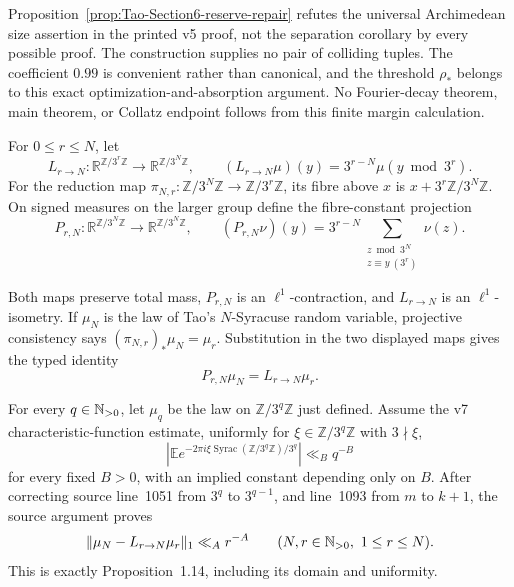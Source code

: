 \begin{nonclaim}
Proposition~\ref{prop:Tao-Section6-reserve-repair} refutes the universal
Archimedean size assertion in the printed v5 proof, not the separation
corollary by every possible proof.  The construction supplies no pair of
colliding tuples.  The coefficient \(0.99\) is convenient rather than
canonical, and the threshold \(\rho_*\) belongs to this exact
optimization-and-absorption argument.  No Fourier-decay theorem, main
theorem, or Collatz endpoint follows from this finite margin calculation.
\end{nonclaim}

\begin{definition}
\label{def:Tao-uniform-lift}
For \(0\le r\le N\), let
\[
 L_{r\to N}:\mathbb R^{\mathbb Z/3^r\mathbb Z}
 \longrightarrow\mathbb R^{\mathbb Z/3^N\mathbb Z},
 \qquad
 (L_{r\to N}\mu)(y)=3^{r-N}\mu(y\bmod3^r).
\]
For the reduction map
\(\pi_{N,r}:\mathbb Z/3^N\mathbb Z\to\mathbb Z/3^r\mathbb Z\), its fibre
above \(x\) is \(x+3^r\mathbb Z/3^N\mathbb Z\).  On signed measures on the
larger group define the fibre-constant projection
\[
 P_{r,N}:\mathbb R^{\mathbb Z/3^N\mathbb Z}
 \longrightarrow\mathbb R^{\mathbb Z/3^N\mathbb Z},\qquad
 (P_{r,N}\nu)(y)=3^{r-N}
 \sum_{\substack{z\bmod3^N\\z\equiv y\ (3^r)}}\nu(z).
\]
\end{definition}

Both maps preserve total mass, \(P_{r,N}\) is an \(\ell^1\)-contraction,
and \(L_{r\to N}\) is an \(\ell^1\)-isometry.  If \(\mu_N\) is the law of
Tao's \(N\)-Syracuse random variable, projective consistency says
\((\pi_{N,r})_*\mu_N=\mu_r\).  Substitution in the two displayed maps gives
the typed identity
\begin{equation}
\label{eq:Tao-lift-projective}
 P_{r,N}\mu_N=L_{r\to N}\mu_r.
\end{equation}

\begin{proposition}
\label{prop:Tao-v7-Fourier-to-mixing}
For every \(q\in\mathbb{N}_{>0}\), let \(\mu_q\) be the law on
\(\mathbb Z/3^q\mathbb Z\) just defined.  Assume the v7
characteristic-function estimate, uniformly for
\(\xi\in\mathbb Z/3^q\mathbb Z\) with \(3\nmid\xi\),
\begin{equation}
\label{eq:Tao-v7-characteristic-input}
 \left|\mathbb E
 e^{-2\pi i\xi\operatorname{Syrac}(\mathbb Z/3^q\mathbb Z)/3^q}
 \right|\ll_Bq^{-B}
\end{equation}
for every fixed \(B>0\), with an implied constant depending only on \(B\).
After correcting source line~1051 from \(3^q\)
to \(3^{q-1}\), and line~1093 from \(m\) to \(k+1\), the source argument
proves
\[
 \|\mu_N-L_{r\to N}\mu_r\|_1\ll_A r^{-A}
 \qquad(N,r\in\mathbb{N}_{>0},\ 1\le r\le N).
\]
This is exactly Proposition~1.14, including its domain and uniformity.
\end{proposition}

